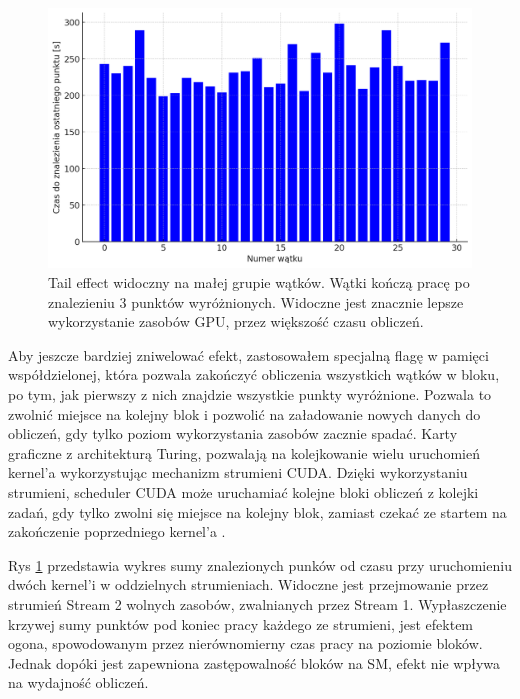 \begin{figure}[H]
    \centering
    \includegraphics[width=1\textwidth]{img/tailing_effect_3_17.png}
    \caption{Tail effect widoczny na małej grupie wątków. Wątki kończą pracę po znalezieniu 3 punktów wyróżnionych.
        Widoczne jest znacznie lepsze wykorzystanie zasobów GPU, przez większość czasu obliczeń.}
    \label{fig:tail_effect_3}
\end{figure}

\par
Aby jeszcze bardziej zniwelować efekt, zastosowałem specjalną flagę w pamięci współdzielonej, która pozwala zakończyć obliczenia wszystkich wątków w bloku,
po tym, jak pierwszy z nich znajdzie wszystkie punkty wyróżnione. Pozwala to zwolnić miejsce na kolejny blok
i pozwolić na załadowanie nowych danych do obliczeń, gdy tylko poziom wykorzystania zasobów zacznie spadać.
Karty graficzne z architekturą Turing,
pozwalają na kolejkowanie wielu uruchomień kernel'a wykorzystując mechanizm strumieni CUDA.
Dzięki wykorzystaniu strumieni, scheduler CUDA
może uruchamiać kolejne bloki obliczeń z kolejki zadań, gdy tylko
zwolni się miejsce na kolejny blok, zamiast czekać ze startem na zakończenie poprzedniego kernel'a \cite{cuda}.
\par
Rys \ref{fig:tail_effect_3} przedstawia wykres sumy znalezionych punków od czasu przy uruchomieniu dwóch kernel'i w oddzielnych strumieniach.
Widoczne jest przejmowanie przez strumień Stream 2 wolnych zasobów, zwalnianych przez Stream 1.
Wypłaszczenie krzywej sumy punktów pod koniec pracy każdego ze strumieni, jest
efektem ogona, spowodowanym przez nierównomierny czas pracy na poziomie bloków.
Jednak dopóki jest zapewniona zastępowalność bloków na SM, efekt nie wpływa na wydajność obliczeń.



